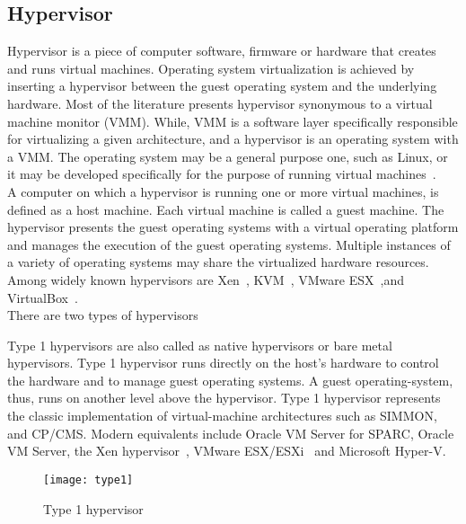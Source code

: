 \subsection{Hypervisor}
Hypervisor is a piece of computer software, firmware or hardware that creates and runs virtual machines. Operating system virtualization is achieved by inserting a hypervisor between the guest operating system and the underlying hardware. Most of the literature presents hypervisor synonymous to a virtual machine monitor (VMM). While, VMM is a software layer specifically responsible for virtualizing a given architecture, and a hypervisor is an operating system with a VMM. The operating system may be a general purpose one, such as Linux, or it may be developed specifically for the purpose of running virtual machines~\cite{Agesen:2010:EXV:1899928.1899930}.
\\[3mm]
A computer on which a hypervisor is running one or more virtual machines, is defined as a host machine. Each virtual machine is called a guest machine. The hypervisor presents the guest operating systems with a virtual operating platform and manages the execution of the guest operating systems. Multiple instances of a variety of operating systems may share the virtualized hardware resources. Among widely known hypervisors are Xen~\cite{Barham:2003:XAV:1165389.945462, Chisnall:2007:DGX:1407351}, KVM~\cite{Habib:2008:VK:1344209.1344217, kivity07kvm}, VMware ESX~\cite{Agesen:2010:EXV:1899928.1899930},and VirtualBox~\cite{citeulike:3149886}.
\\[3mm]
There are two types of hypervisors~\cite{Goldberg:1973:AVM:800122.803950}
\begin{description}
\item Type 1 hypervisors are also called as native hypervisors or bare metal hypervisors. Type 1 hypervisor runs directly on the host's hardware to control the hardware and to manage guest operating systems. A guest operating-system, thus, runs on another level above the hypervisor. Type 1 hypervisor represents the classic implementation of virtual-machine architectures such as SIMMON, and CP/CMS. Modern equivalents include Oracle VM Server for SPARC, Oracle VM Server, the Xen hypervisor~\cite{Barham:2003:XAV:1165389.945462}, VMware ESX/ESXi~\cite{Agesen:2010:EXV:1899928.1899930} and Microsoft Hyper-V.
\end{description}
\begin{figure}[!ht]
\centering
\texttt{[image: type1]}
\caption{Type 1 hypervisor}
\label{Type 1 hypervisor}
\end{figure}
